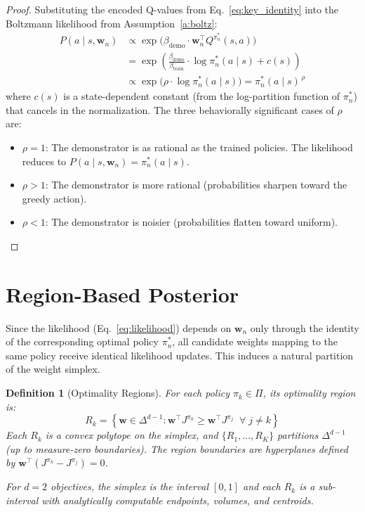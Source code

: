 \documentclass[11pt]{article}
\newtheorem{definition}{Definition}
\begin{document}
\begin{proof}
Substituting the encoded Q-values from Eq.~\eqref{eq:key_identity} into the Boltzmann likelihood from Assumption~\ref{a:boltz}:
\begin{align}
    P(a \mid s, \mathbf{w}_n) &\propto \exp\!\big(\beta_{\text{demo}} \cdot \mathbf{w}_n^\top Q^{\pi_n^*}(s, a)\big) \nonumber \\
    &= \exp\!\left(\frac{\beta_{\text{demo}}}{\beta_{\text{train}}} \cdot \log \pi_n^*(a \mid s) + c(s)\right) \nonumber \\
    &\propto \exp\!\big(\rho \cdot \log \pi_n^*(a \mid s)\big) = \pi_n^*(a \mid s)^{\,\rho}
\end{align}
where $c(s)$ is a state-dependent constant (from the log-partition function of $\pi_n^*$) that cancels in the normalization. The three behaviorally significant cases of $\rho$ are:
\begin{itemize}[itemsep=2pt]
    \item $\rho = 1$: The demonstrator is as rational as the trained policies. The likelihood reduces to $P(a \mid s, \mathbf{w}_n) = \pi_n^*(a \mid s)$.
    \item $\rho > 1$: The demonstrator is more rational (probabilities sharpen toward the greedy action).
    \item $\rho < 1$: The demonstrator is noisier (probabilities flatten toward uniform).
\end{itemize}
\end{proof}

\section{Region-Based Posterior}

Since the likelihood (Eq.~\ref{eq:likelihood}) depends on $\mathbf{w}_n$ only through the identity of the corresponding optimal policy $\pi_n^*$, all candidate weights mapping to the same policy receive identical likelihood updates. This induces a natural partition of the weight simplex.

\begin{definition}[Optimality Regions]
For each policy $\pi_k \in \Pi$, its optimality region is:
\begin{equation}
    R_k = \left\{\mathbf{w} \in \Delta^{d-1} : \mathbf{w}^\top J^{\pi_k} \geq \mathbf{w}^\top J^{\pi_j} \;\;\forall\; j \neq k\right\}
\end{equation}
Each $R_k$ is a convex polytope on the simplex, and $\{R_1, \ldots, R_K\}$ partitions $\Delta^{d-1}$ (up to measure-zero boundaries). The region boundaries are hyperplanes defined by $\mathbf{w}^\top(J^{\pi_k} - J^{\pi_j}) = 0$.

For $d = 2$ objectives, the simplex is the interval $[0,1]$ and each $R_k$ is a sub-interval with analytically computable endpoints, volumes, and centroids.
\end{definition}
\end{document}
